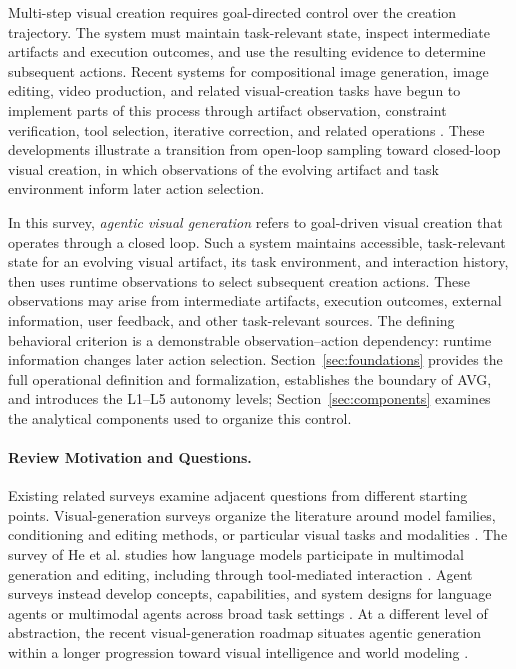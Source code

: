 Multi-step visual creation requires goal-directed control over the creation trajectory. The system must maintain task-relevant state, inspect intermediate artifacts and execution outcomes, and use the resulting evidence to determine subsequent actions. Recent systems for compositional image generation, image editing, video production, and related visual-creation tasks have begun to implement parts of this process through artifact observation, constraint verification, tool selection, iterative correction, and related operations \cite{wang2024divide,he2024kubrick,gupta2025costa}. These developments illustrate a transition from open-loop sampling toward closed-loop visual creation, in which observations of the evolving artifact and task environment inform later action selection.

In this survey, \emph{agentic visual generation} refers to goal-driven visual creation that operates through a closed loop. Such a system maintains accessible, task-relevant state for an evolving visual artifact, its task environment, and interaction history, then uses runtime observations to select subsequent creation actions. These observations may arise from intermediate artifacts, execution outcomes, external information, user feedback, and other task-relevant sources. The defining behavioral criterion is a demonstrable observation--action dependency: runtime information changes later action selection. Section~\ref{sec:foundations} provides the full operational definition and formalization, establishes the boundary of AVG, and introduces the L1--L5 autonomy levels; Section~\ref{sec:components} examines the analytical components used to organize this control.

\paragraph{Review Motivation and Questions.}
Existing related surveys examine adjacent questions from different starting points. Visual-generation surveys organize the literature around model families, conditioning and editing methods, or particular visual tasks and modalities \cite{yang2025textimage,wang2025imageediting,yin2025spatiotemporal}. The survey of He et al. studies how language models participate in multimodal generation and editing, including through tool-mediated interaction \cite{he2024llms}. Agent surveys instead develop concepts, capabilities, and system designs for language agents or multimodal agents across broad task settings \cite{durante2024agentai,xie2024large,jiang2024rationality,schneider2025generative}. At a different level of abstraction, the recent visual-generation roadmap situates agentic generation within a longer progression toward visual intelligence and world modeling \cite{wu2026visualgeneration}.

